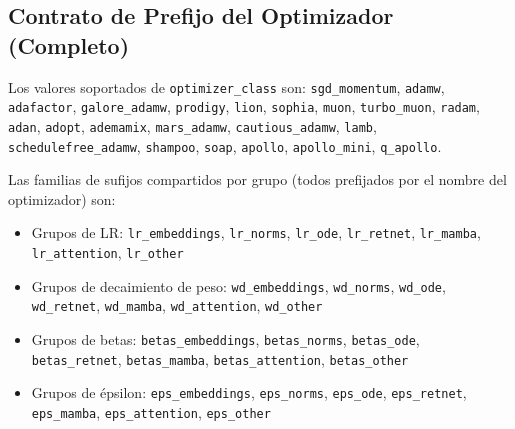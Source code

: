 \subsection{Contrato de Prefijo del Optimizador (Completo)}

Los valores soportados de \texttt{optimizer\_class} son:
\texttt{sgd\_momentum}, \texttt{adamw}, \texttt{adafactor}, \texttt{galore\_adamw}, \texttt{prodigy}, \texttt{lion}, \texttt{sophia}, \texttt{muon}, \texttt{turbo\_muon}, \texttt{radam}, \texttt{adan}, \texttt{adopt}, \texttt{ademamix}, \texttt{mars\_adamw}, \texttt{cautious\_adamw}, \texttt{lamb}, \texttt{schedulefree\_adamw}, \texttt{shampoo}, \texttt{soap}, \texttt{apollo}, \texttt{apollo\_mini}, \texttt{q\_apollo}.

Las familias de sufijos compartidos por grupo (todos prefijados por el nombre del optimizador) son:
\begin{itemize}[leftmargin=*]
    \item Grupos de LR: \texttt{lr\_embeddings}, \texttt{lr\_norms}, \texttt{lr\_ode}, \texttt{lr\_retnet}, \texttt{lr\_mamba}, \texttt{lr\_attention}, \texttt{lr\_other}
    \item Grupos de decaimiento de peso: \texttt{wd\_embeddings}, \texttt{wd\_norms}, \texttt{wd\_ode}, \texttt{wd\_retnet}, \texttt{wd\_mamba}, \texttt{wd\_attention}, \texttt{wd\_other}
    \item Grupos de betas: \texttt{betas\_embeddings}, \texttt{betas\_norms}, \texttt{betas\_ode}, \texttt{betas\_retnet}, \texttt{betas\_mamba}, \texttt{betas\_attention}, \texttt{betas\_other}
    \item Grupos de épsilon: \texttt{eps\_embeddings}, \texttt{eps\_norms}, \texttt{eps\_ode}, \texttt{eps\_retnet}, \texttt{eps\_mamba}, \texttt{eps\_attention}, \texttt{eps\_other}
\end{itemize}

